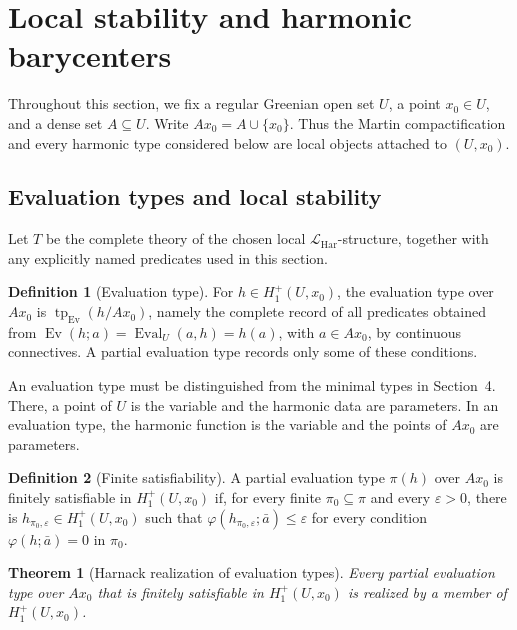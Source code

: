 \documentclass{amsart}
\newtheorem{theorem}{Theorem}[section]
\theoremstyle{definition}
\newtheorem{definition}{Definition}[section]
\theoremstyle{remark}
\numberwithin{equation}{section}
\begin{document}
\section{Local stability and harmonic barycenters}
\label{sec:local-stability-harmonic-barycenters}

Throughout this section, we fix a regular Greenian open set $U$, a point
$x_0\in U$, and a dense set $A\subseteq U$. Write $Ax_0=A\cup\{x_0\}$.
Thus the Martin compactification and every harmonic type considered below are local objects attached to $(U,x_0)$.

\subsection{Evaluation types and local stability}
\label{subsec:evaluation-types-local-stability}

Let $T$ be the complete theory of the chosen local $\mathcal L_{\mathrm{Har}}$-structure, together with any explicitly named predicates used in this section.

\begin{definition}[Evaluation type]
For $h\in H_1^+(U,x_0)$, the evaluation type over $Ax_0$ is
$\operatorname{tp}_{\operatorname{Ev}}(h/Ax_0)$, namely the complete
record of all predicates obtained from $\operatorname{Ev}(h;a)=\operatorname{Eval}_U(a,h)=h(a)$,
with $a\in Ax_0$, by continuous connectives. A partial evaluation
type records only some of these conditions.
\end{definition}

An evaluation type must be distinguished from the minimal types in Section~4. There, a point of $U$ is the variable and the harmonic data are parameters. In an evaluation type, the harmonic function is the variable and the points of $Ax_0$ are parameters.

\begin{definition}[Finite satisfiability]
\label{def:finite-satisfiability-evaluation-types}
A partial evaluation type $\pi(h)$ over $Ax_0$ is finitely
satisfiable in $H_1^+(U,x_0)$ if, for every finite
$\pi_0\subseteq\pi$ and every $\varepsilon>0$, there is
$h_{\pi_0,\varepsilon}\in H_1^+(U,x_0)$ such that
$\varphi(h_{\pi_0,\varepsilon};\bar a)\le\varepsilon$ for every
condition $\varphi(h;\bar a)=0$ in $\pi_0$.
\end{definition}

\begin{theorem}[Harnack realization of evaluation types]
\label{thm:harnack-realization-evaluation-types}
Every partial evaluation type over $Ax_0$ that is finitely
satisfiable in $H_1^+(U,x_0)$ is realized by a member of
$H_1^+(U,x_0)$.
\end{theorem}
\end{document}
